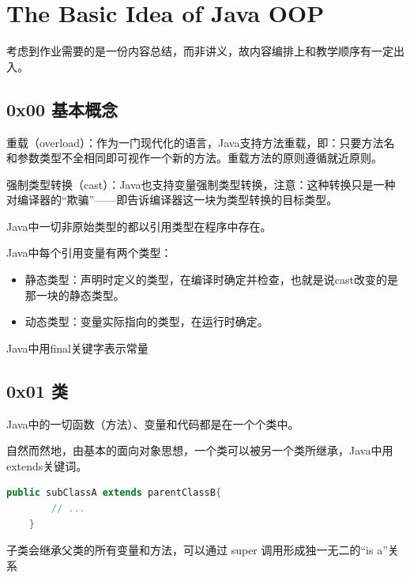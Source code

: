 \vspace{-3cm}\chapter{The Basic Idea of Java OOP}

考虑到作业需要的是一份内容总结，而非讲义，故内容编排上和教学顺序有一定出入。

\section{0x00 基本概念}

重载（overload）：作为一门现代化的语言，Java支持方法重载，即：只要方法名和参数类型不全相同即可视作一个新的方法。重载方法的原则遵循就近原则。

强制类型转换（cast）：Java也支持变量强制类型转换，注意：这种转换只是一种对编译器的“欺骗”——即告诉编译器这一块为类型转换的目标类型。

Java中一切非原始类型的都以引用类型在程序中存在。

Java中每个引用变量有两个类型：
\begin{itemize}
    \item 静态类型：声明时定义的类型，在编译时确定并检查，也就是说cast改变的是那一块的静态类型。
    \item 动态类型：变量实际指向的类型，在运行时确定。
\end{itemize}

Java中用final关键字表示常量

\section{0x01 类}

Java中的一切函数（方法）、变量和代码都是在一个个类中。

自然而然地，由基本的面向对象思想，一个类可以被另一个类所继承，Java中用extends关键词。
\begin{lstlisting}[language = Java]
    public subClassA extends parentClassB{
        // ... 
    }
\end{lstlisting}

子类会继承父类的所有变量和方法，可以通过 super 调用形成独一无二的“is a”关系

